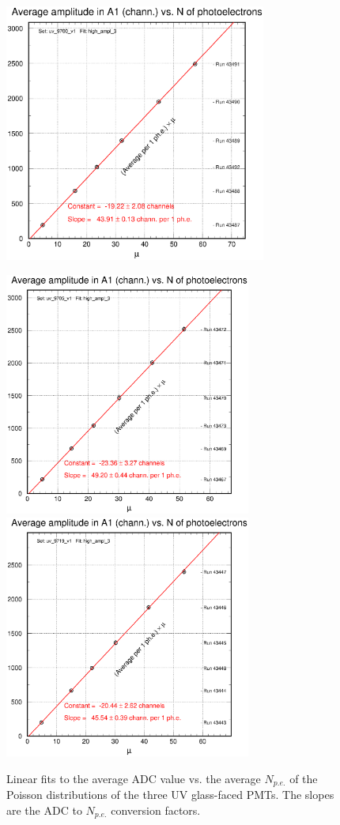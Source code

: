 \begin{figure}
\vspace{0.5cm}
\begin{centering}
\includegraphics[height=8.5cm]{PMT-studies/uv_9700_v1_result.eps}
\end{centering}
\begin{centering}
\includegraphics[height=8.0cm]{PMT-studies/uv_9705_v1_result.eps}
\includegraphics[height=8.0cm]{PMT-studies/uv_9719_v1_result.eps}
\vspace{0.5cm}
\caption{\small{Linear fits to the average ADC value vs. the average 
$N_{p.e.}$ of the Poisson distributions of the three UV glass-faced PMTs. 
The slopes are the ADC to $N_{p.e.}$ conversion factors.}}
\label{linear_uvglass}
\end{centering}
\end{figure}

